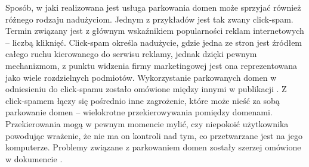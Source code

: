 Sposób, w jaki realizowana jest usługa parkowania domen może sprzyjać również różnego rodzaju nadużyciom. Jednym z przykładów jest tak
zwany click-spam. Termin związany jest z głównym wskaźnikiem popularności reklam internetowych -- liczbą kliknięć. Click-spam określa
nadużycie, gdzie jedna ze stron jest źródłem całego ruchu kierowanego do serwisu reklamy, jednak dzięki pewnym mechanizmom, z punktu
widzenia firmy marketingowej jest ona reprezentowana jako wiele rozdzielnych podmiotów. Wykorzystanie parkowanych domen w odniesieniu
do click-spamu zostało omówione między innymi w publikacji \cite{measuring-and-fingerprinting-click-spam-in-ad-networks}.
Z click-spamem łączy się pośrednio inne zagrożenie, które może nieść za sobą parkowanie domen -- wielokrotne przekierowywania
pomiędzy domenami. Przekierowania mogą w pewnym momencie mylić, czy niepokoić użytkownika powodując wrażenie, że nie ma on
kontroli nad tym, co przetwarzane jest na jego komputerze. Problemy związane z parkowaniem domen zostały szerzej omówione w
dokumencie \cite{domain_parking}.
